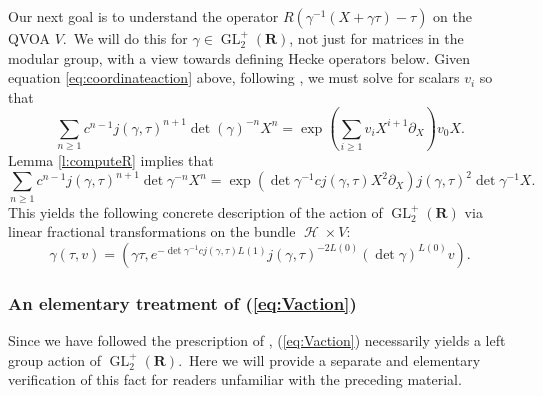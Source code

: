 \documentclass[12pt]{amsart}
\theoremstyle{plain}
\theoremstyle{definition}
\theoremstyle{remark}
\DeclareMathOperator{\uhp}{\mathcal{H}}
\DeclareMathOperator{\GL}{GL}
\newcommand{\RR}{\mathbf{R}}
\begin{document}
Our next goal is to understand the operator $R(\gamma^{-1}(X+\gamma \tau)-\tau)$ on the QVOA $V$.\ We will do this for $\gamma \in \GL_2^+(\RR)$, not just for matrices in the modular group, with a view towards defining Hecke operators below. Given equation \eqref{eq:coordinateaction} above, following \cite{FBZ}, we must solve for scalars $v_i$ so that
\[
\sum_{n\geq 1} c^{n-1}j(\gamma,\tau)^{n+1}\det(\gamma)^{-n}X^n = \exp\left(\sum_{i \geq 1} v_i X^{i+1}\partial_X\right) v_0X.
\]
Lemma \ref{l:computeR} implies that
\[
\sum_{n\geq 1} c^{n-1}j(\gamma,\tau)^{n+1}\det\gamma^{-n}X^n = \exp\left(\det\gamma^{-1}cj(\gamma,\tau)X^{2}\partial_X\right) j(\gamma,\tau)^2 \det\gamma^{-1}X.
\]
This yields the following concrete description of the action of $\GL_2^+(\RR)$ via linear fractional transformations on the bundle $\uhp\times V$:
\begin{equation}
\label{eq:Vaction}
\gamma(\tau,v) = (\gamma \tau, e^{-\det\gamma^{-1}cj(\gamma,\tau)L(1)}j(\gamma,\tau)^{-2L(0)} (\det\gamma)^{L(0)}v).
\end{equation}

\subsubsection{An elementary treatment of (\ref{eq:Vaction}) }
Since we have followed the prescription of \cite{FBZ}, (\ref{eq:Vaction}) necessarily yields a left group action of $\GL_2^+(\RR)$.\ Here we will provide a separate and elementary verification of this fact for readers unfamiliar with the preceding material.
\end{document}

